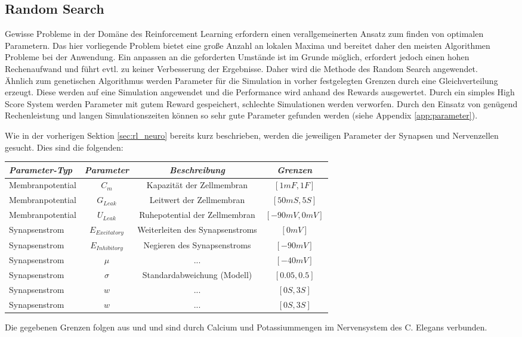 	\subsection{Random Search}
		Gewisse Probleme in der Domäne des Reinforcement Learning erfordern einen verallgemeinerten Ansatz zum finden von optimalen Parametern. Das hier vorliegende Problem bietet eine große Anzahl an lokalen Maxima und bereitet daher den meisten Algorithmen Probleme bei der Anwendung. Ein anpassen an die geforderten Umstände ist im Grunde möglich, erfordert jedoch einen hohen Rechenaufwand und führt evtl. zu keiner Verbesserung der Ergebnisse. Daher wird die Methode des Random Search angewendet.\\
		Ähnlich zum genetischen Algorithmus werden Parameter für die Simulation in vorher festgelegten Grenzen durch eine Gleichverteilung erzeugt. Diese werden auf eine Simulation angewendet und die Performance wird anhand des Rewards ausgewertet. Durch ein simples High Score System werden Parameter mit gutem Reward gespeichert, schlechte Simulationen werden verworfen. Durch den Einsatz von genügend Rechenleistung und langen Simulationszeiten können so sehr gute Parameter gefunden werden (siehe Appendix \ref{app:parameter}).
		
	
	Wie in der vorherigen Sektion \ref{sec:rl_neuro} bereits kurz beschrieben, werden die jeweiligen Parameter der Synapsen und Nervenzellen gesucht. Dies sind die folgenden:
	\begin{center}
		\begin{tabular}{l@{\hskip 0.5cm}c@{\hskip 0.5cm}c@{\hskip 0.5cm}c}    \toprule
			\setlength{\tabcolsep}{50pt}
			\renewcommand{\arraystretch}{1.5}
			\emph{Parameter-Typ} 	& \emph{Parameter}  & \emph{Beschreibung} 				& \emph{Grenzen} 					 \\\midrule
			Membranpotential		& $C_m$				& Kapazität der Zellmembran			& $[1mF, 1F]$						 \\ 
			Membranpotential	 	& $G_{Leak}$		& Leitwert der Zellmembran			& $[50mS, 5S]$						 \\
			Membranpotential	 	& $U_{Leak}$		& Ruhepotential der Zellmembran		& $[-90mV, 0mV]$						 \\
			Synapsenstrom			& $E_{Excitatory}$	& Weiterleiten des Synapsenstroms	& $[0mV]$							 \\
			Synapsenstrom			& $E_{Inhibitory}$	& Negieren des Synapsenstroms		& $[-90mV]$							 \\ 
			Synapsenstrom			& $\mu$				& ...								& $[-40mV]$							 \\
			Synapsenstrom			& $\sigma$			& Standardabweichung (Modell)		& $[0.05, 0.5]$						 \\ 
			Synapsenstrom		 	& $w$				& ...								& $[0S, 3S]$							 \\
			Synapsenstrom				& $\hat{w}$			& ...								& $[0S, 3S]$							 \\\bottomrule
			\hline
		\end{tabular}
	\end{center}
	Die gegebenen Grenzen folgen aus \cite{WormLevelRL} und \cite{SimCE} und sind durch Calcium und Potassiummengen im Nervensystem des C. Elegans verbunden.

